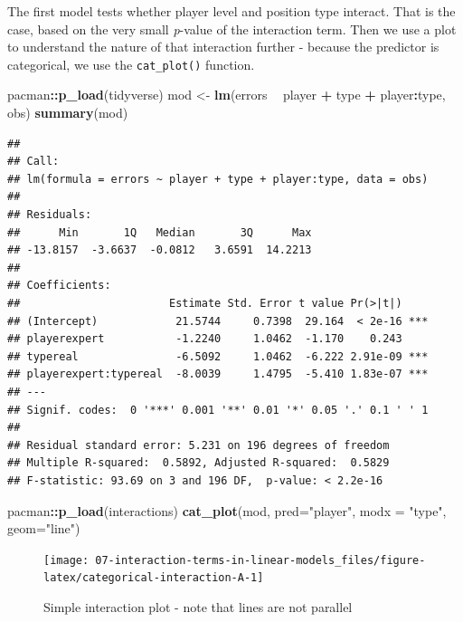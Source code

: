 \documentclass[
]{book}
\newenvironment{Shaded}{\begin{snugshade}}{\end{snugshade}}
\newcommand{\DataTypeTok}[1]{\textcolor[rgb]{0.13,0.29,0.53}{#1}}
\newcommand{\KeywordTok}[1]{\textcolor[rgb]{0.13,0.29,0.53}{\textbf{#1}}}
\newcommand{\NormalTok}[1]{#1}
\newcommand{\OperatorTok}[1]{\textcolor[rgb]{0.81,0.36,0.00}{\textbf{#1}}}
\newcommand{\StringTok}[1]{\textcolor[rgb]{0.31,0.60,0.02}{#1}}
\begin{document}
The first model tests whether player level and position type interact. That is the case, based on the very small \emph{p}-value of the interaction term. Then we use a plot to understand the nature of that interaction further - because the predictor is categorical, we use the \texttt{cat\_plot()} function.

\begin{Shaded}
\begin{Highlighting}[]
\NormalTok{pacman}\OperatorTok{::}\KeywordTok{p_load}\NormalTok{(tidyverse)}
\NormalTok{mod <-}\StringTok{ }\KeywordTok{lm}\NormalTok{(errors }\OperatorTok{~}\StringTok{ }\NormalTok{player }\OperatorTok{+}\StringTok{ }\NormalTok{type }\OperatorTok{+}\StringTok{ }\NormalTok{player}\OperatorTok{:}\NormalTok{type, obs)}
\KeywordTok{summary}\NormalTok{(mod)}
\end{Highlighting}
\end{Shaded}

\begin{verbatim}
## 
## Call:
## lm(formula = errors ~ player + type + player:type, data = obs)
## 
## Residuals:
##      Min       1Q   Median       3Q      Max 
## -13.8157  -3.6637  -0.0812   3.6591  14.2213 
## 
## Coefficients:
##                       Estimate Std. Error t value Pr(>|t|)    
## (Intercept)            21.5744     0.7398  29.164  < 2e-16 ***
## playerexpert           -1.2240     1.0462  -1.170    0.243    
## typereal               -6.5092     1.0462  -6.222 2.91e-09 ***
## playerexpert:typereal  -8.0039     1.4795  -5.410 1.83e-07 ***
## ---
## Signif. codes:  0 '***' 0.001 '**' 0.01 '*' 0.05 '.' 0.1 ' ' 1
## 
## Residual standard error: 5.231 on 196 degrees of freedom
## Multiple R-squared:  0.5892,	Adjusted R-squared:  0.5829 
## F-statistic: 93.69 on 3 and 196 DF,  p-value: < 2.2e-16
\end{verbatim}

\begin{Shaded}
\begin{Highlighting}[]
\NormalTok{pacman}\OperatorTok{::}\KeywordTok{p_load}\NormalTok{(interactions)}
\KeywordTok{cat_plot}\NormalTok{(mod, }\DataTypeTok{pred=}\StringTok{"player"}\NormalTok{, }\DataTypeTok{modx =} \StringTok{"type"}\NormalTok{, }\DataTypeTok{geom=}\StringTok{"line"}\NormalTok{)}
\end{Highlighting}
\end{Shaded}

\begin{figure}

{\centering \texttt{[image: 07-interaction-terms-in-linear-models\_files/figure-latex/categorical-interaction-A-1]} 

}

\caption{Simple interaction plot - note that lines are not parallel}\label{fig:categorical-interaction-A}
\end{figure}
\end{document}
